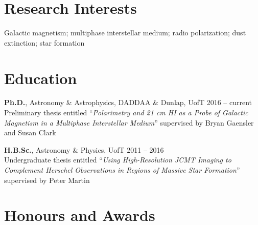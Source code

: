 \documentclass[10pt]{res} %
\begin{document}
\begin{resume}


\section{\Large Research Interests}
\vspace{-5pt} %
\noindent\makebox[\linewidth]{\rule{\textwidth}{0.4pt}}
\vspace{-20pt} %

Galactic magnetism; multiphase interstellar medium; radio polarization; dust extinction; star formation


\section{\Large Education}
\vspace{-5pt} %
\noindent\makebox[\linewidth]{\rule{\textwidth}{0.4pt}}
\vspace{-20pt} %

{\bf Ph.D.}, Astronomy \& Astrophysics, DADDAA \& Dunlap, UofT \hfill 2016 -- current \\
Preliminary thesis entitled ``\textit{Polarimetry and 21 cm HI as a Probe of Galactic Magnetism in a Multiphase Interstellar Medium}'' supervised by Bryan Gaensler and Susan Clark

{\bf H.B.Sc.}, Astronomy \& Physics, UofT \hfill 2011 -- 2016 \\ 
Undergraduate thesis entitled ``\textit{Using High-Resolution JCMT Imaging to Complement Herschel Observations in Regions of Massive Star Formation}'' supervised by Peter Martin
 

\section{\Large Honours and Awards}
\vspace{-5pt} %
\noindent\makebox[\linewidth]{\rule{\textwidth}{0.4pt}}
\vspace{-20pt} %


\end{resume}
\end{document}
